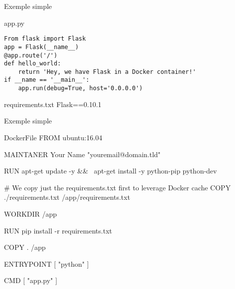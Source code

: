 \begin{frame}[fragile]{Exemple simple}
    \begin{block}{app.py}
        \begin{verbatim}
From flask import Flask
app = Flask(__name__)
@app.route('/')
def hello_world:
    return 'Hey, we have Flask in a Docker container!'
if __name == '__main__':
    app.run(debug=True, host='0.0.0.0')
\end{verbatim}
    \end{block}
    \begin{block}{requirements.txt}
    Flask==0.10.1
    \end{block}
\end{frame}


\begin{frame}{Exemple simple}
    \begin{block}{DockerFile}
    FROM ubuntu:16.04

MAINTANER Your Name "youremail@domain.tld"

RUN apt-get update -y && \
    apt-get install -y python-pip python-dev

# We copy just the requirements.txt first to leverage Docker cache
COPY ./requirements.txt /app/requirements.txt

WORKDIR /app

RUN pip install -r requirements.txt

COPY . /app

ENTRYPOINT [ "python" ]

CMD [ "app.py" ]
    \end{block}
\end{frame}